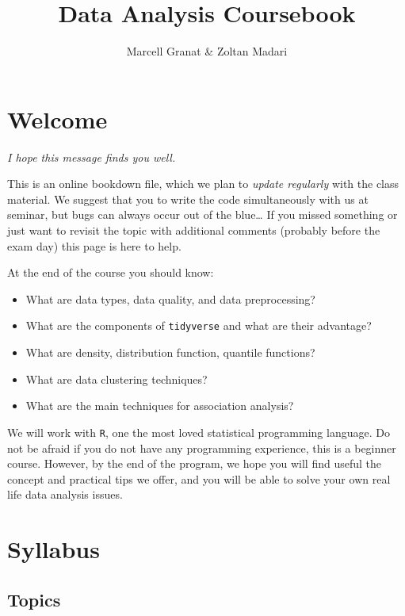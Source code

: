 \documentclass[
]{article}
\title{\textbf{Data Analysis} Coursebook}
\author{Marcell Granat \& Zoltan Madari}
\date{}
\begin{document}
\maketitle

{
\setcounter{tocdepth}{2}
\tableofcontents
}
\pagebreak

\hypertarget{welcome}{%
\section*{Welcome}\label{welcome}}

\emph{I hope this message finds you well.}

This is an online bookdown file, which we plan to \emph{update regularly} with the class material. We suggest that you to write the code simultaneously with us at seminar, but bugs can always occur out of the blue\ldots{} If you missed something or just want to revisit the topic with additional comments (probably before the exam day) this page is here to help.

At the end of the course you should know:

\begin{itemize}
\item
  What are data types, data quality, and data preprocessing?
\item
  What are the components of \texttt{tidyverse} and what are their advantage?
\item
  What are density, distribution function, quantile functions?
\item
  What are data clustering techniques?
\item
  What are the main techniques for association analysis?
\end{itemize}

We will work with \texttt{R}, one the most loved statistical programming language. Do not be afraid if you do not have any programming experience, this is a beginner course. However, by the end of the program, we hope you will find useful the concept and practical tips we offer, and you will be able to solve your own real life data analysis issues.

\hypertarget{syllabus}{%
\section*{Syllabus}\label{syllabus}}

\hypertarget{topics}{%
\subsection{Topics}\label{topics}}
\end{document}
